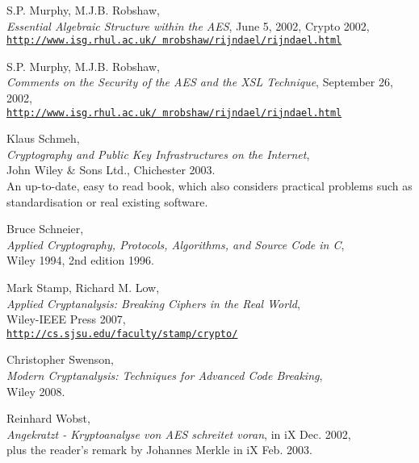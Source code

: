 \begin{thebibliography}{99999}
  
       S.P. Murphy, M.J.B. Robshaw, \\
       {\em Essential Algebraic Structure within the AES}, 
       June 5, 2002, Crypto 2002,  \\
       \href{http://www.isg.rhul.ac.uk/\~{}mrobshaw/rijndael/rijndael.html}
       {\texttt{http://www.isg.rhul.ac.uk/~mrobshaw/rijndael/rijndael.html}}

  
       S.P. Murphy, M.J.B. Robshaw, \\
       {\em Comments on the Security of the AES and the XSL Technique}, 
       September 26, 2002, \\
       \href{http://www.isg.rhul.ac.uk/\~{}mrobshaw/rijndael/rijndael.html}
       {\texttt{http://www.isg.rhul.ac.uk/~mrobshaw/rijndael/rijndael.html}}

  
       Klaus Schmeh, \\
       {\em Cryptography and Public Key Infrastructures on the Internet},\\ 
       John Wiley \& Sons Ltd., Chichester 2003. \\
       An up-to-date, easy to read book, which also considers practical
       problems such as standardisation or real existing software.

  
       Bruce Schneier, \\
       {\em Applied Cryptography, Protocols, Algorithms, and Source Code in C}, \\
       Wiley 1994, 2nd edition 1996.

  
       Mark Stamp, Richard M. Low, \\
       {\em Applied Cryptanalysis: Breaking Ciphers in the Real World}, \\
       Wiley-IEEE Press 2007, \\
       \href{http://cs.sjsu.edu/faculty/stamp/crypto/}
       {\texttt{http://cs.sjsu.edu/faculty/stamp/crypto/}}

  
       Christopher Swenson, \\
       {\em Modern Cryptanalysis: Techniques for Advanced Code Breaking}, \\
       Wiley 2008.

  
       Reinhard Wobst, \\
       {\em Angekratzt - Kryptoanalyse von AES schreitet voran}, 
       in iX Dec. 2002, \\
       plus the reader's remark by Johannes Merkle in iX Feb. 2003.

\end{thebibliography}


